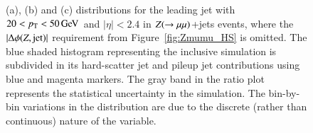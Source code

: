 \documentclass{atlasnote}
\begin{document}
\begin{figure}[!htbp]
  \centering
  \caption{\cJVF (a), \RpT (b) and \JVT (c) distributions for the leading jet with $20<p_{\mathrm{T}}<50\,\text{Ge\hspace{-.08em}V}$ and $|\eta|<2.4$ in $Z(\rightarrow\mu\mu)$+jets events, where the $|\Delta \phi(Z, {\rm jet})|$
      requirement from Figure~\ref{fig:Zmumu_HS} is omitted.
  The blue shaded histogram representing the inclusive simulation is subdivided in its hard-scatter jet and pileup jet contributions
  using blue and magenta markers. 
  The gray band in the ratio plot represents the statistical uncertainty in the simulation. The bin-by-bin variations in the \JVT distribution are due to the discrete (rather than continuous) nature of the variable.
  }
  \label{fig:Zmumu_incl}
\end{figure}
\end{document}
